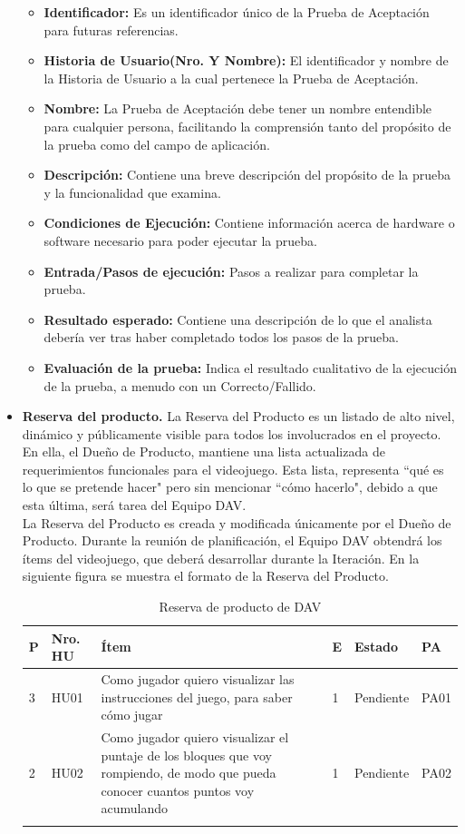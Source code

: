 \documentclass[a4paper, openright, 12pt]{report}
\begin{document}
\begin{itemize}
\begin{itemize}
\item \textbf{Identificador:} Es un identificador único de la Prueba de Aceptación para futuras referencias.
\item \textbf{Historia de Usuario(Nro. Y Nombre):} El identificador y nombre de la Historia de Usuario a la cual pertenece la Prueba de Aceptación.
\item \textbf{Nombre:} La Prueba de Aceptación debe tener un nombre entendible para cualquier persona, facilitando la comprensión tanto del propósito de la prueba como del campo de aplicación.
\item \textbf{Descripción:} Contiene una breve descripción del propósito de la prueba y la funcionalidad que examina.
\item \textbf{Condiciones de Ejecución:} Contiene información acerca de hardware o software necesario para poder ejecutar la prueba.
\item \textbf{Entrada/Pasos de ejecución:} Pasos a realizar para completar la prueba.
\item \textbf{Resultado esperado:} Contiene una descripción de lo que el analista debería ver tras haber completado todos los pasos de la prueba.
\item \textbf{Evaluación de la prueba:} Indica el resultado cualitativo de la ejecución de la prueba, a menudo con un Correcto/Fallido.
\end{itemize}

\item \textbf{Reserva del producto.} La Reserva del Producto es un listado de alto nivel, dinámico y públicamente visible para todos los involucrados en el proyecto. En ella, el Dueño de Producto, mantiene una lista actualizada de requerimientos funcionales para el videojuego. Esta lista, representa ``qué es lo que se pretende hacer" pero sin mencionar ``cómo hacerlo", debido a que esta última, será tarea del Equipo DAV.\\
La Reserva del Producto es creada y modificada únicamente por el Dueño de Producto. Durante la reunión de planificación, el Equipo DAV obtendrá los ítems del videojuego, que deberá desarrollar durante la Iteración. En la siguiente figura se muestra el formato de la Reserva del Producto.

\begin{longtable}{| l | l | p{5cm} | l | l | l |}
\captionsetup{justification=centering,margin=2cm}
\hline
\textbf{P} & \textbf{Nro. HU} & \textbf{Ítem} & \textbf{E} & \textbf{Estado} & \textbf{PA}\\ \hline
3 & HU01 &
Como jugador quiero visualizar las instrucciones del juego, para saber cómo jugar &
1 & Pendiente & PA01 \\ \hline
2 & HU02 &
Como jugador quiero visualizar el puntaje de los bloques que voy rompiendo, de modo que pueda conocer cuantos puntos voy acumulando  &
1 & Pendiente & PA02\\ \hline
\caption{Reserva de producto de DAV}
\end{longtable}


\end{itemize}
\end{document}
